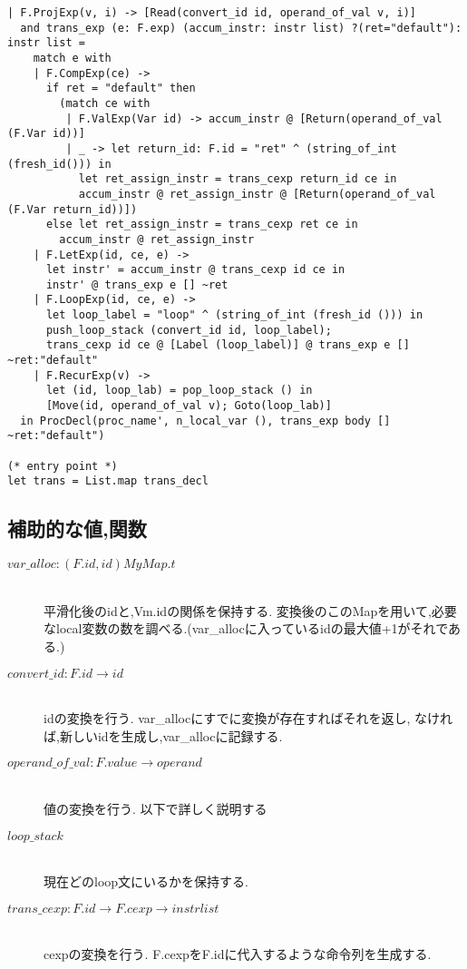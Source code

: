 \begin{lstlisting}[caption=vm.ml]
    | F.ProjExp(v, i) -> [Read(convert_id id, operand_of_val v, i)]
  and trans_exp (e: F.exp) (accum_instr: instr list) ?(ret="default"): instr list = 
    match e with
    | F.CompExp(ce) -> 
      if ret = "default" then
        (match ce with 
         | F.ValExp(Var id) -> accum_instr @ [Return(operand_of_val (F.Var id))]
         | _ -> let return_id: F.id = "ret" ^ (string_of_int (fresh_id())) in
           let ret_assign_instr = trans_cexp return_id ce in
           accum_instr @ ret_assign_instr @ [Return(operand_of_val (F.Var return_id))])
      else let ret_assign_instr = trans_cexp ret ce in
        accum_instr @ ret_assign_instr
    | F.LetExp(id, ce, e) ->
      let instr' = accum_instr @ trans_cexp id ce in
      instr' @ trans_exp e [] ~ret 
    | F.LoopExp(id, ce, e) -> 
      let loop_label = "loop" ^ (string_of_int (fresh_id ())) in
      push_loop_stack (convert_id id, loop_label);
      trans_cexp id ce @ [Label (loop_label)] @ trans_exp e [] ~ret:"default"
    | F.RecurExp(v) -> 
      let (id, loop_lab) = pop_loop_stack () in
      [Move(id, operand_of_val v); Goto(loop_lab)]
  in ProcDecl(proc_name', n_local_var (), trans_exp body [] ~ret:"default")

(* entry point *)
let trans = List.map trans_decl
\end{lstlisting}

\subsection*{補助的な値,関数}

\begin{description}

\item[$var\_alloc: (F.id, id) MyMap.t$] \hfill \\
平滑化後のidと,Vm.idの関係を保持する. 変換後のこのMapを用いて,必要なlocal変数の数を調べる.(var\_allocに入っているidの最大値+1がそれである.)

\item[$convert\_id: F.id \rightarrow id$] \hfill \\
idの変換を行う. var\_allocにすでに変換が存在すればそれを返し,
なければ,新しいidを生成し,var\_allocに記録する.

\item[$operand\_of\_val: F.value \rightarrow operand$] \hfill \\
値の変換を行う. 以下で詳しく説明する

\item[$loop\_stack$] \hfill \\
現在どのloop文にいるかを保持する.

\item[$trans\_cexp: F.id \rightarrow F.cexp \rightarrow instr list$] \hfill \\
cexpの変換を行う. F.cexpをF.idに代入するような命令列を生成する.
\end{description}

